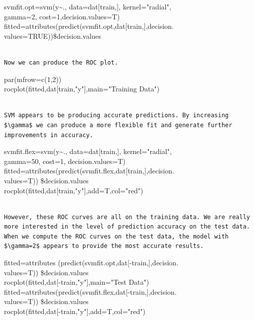 \documentclass[10pt]{article}
\begin{document}
\begin{displayquote}
svmfit.opt=svm(y\~{}., data=dat[train,], kernel="radial",\\
gamma=2, cost=1,decision.values=T)\\[0pt]
fitted=attributes(predict(svmfit.opt,dat[train,],decision.\\
values=TRUE))\$decision.values
\end{displayquote}

\begin{verbatim}

Now we can produce the ROC plot.
\end{verbatim}

\begin{displayquote}
par(mfrow=c(1,2))\\[0pt]
rocplot(fitted,dat[train,"y"],main="Training Data")
\end{displayquote}

\begin{verbatim}

SVM appears to be producing accurate predictions. By increasing $\gamma$ we can produce a more flexible fit and generate further improvements in accuracy.
\end{verbatim}

\begin{displayquote}
svmfit.flex=svm(y\~{}., data=dat[train,], kernel="radial",\\
gamma=50, cost=1, decision.values=T)\\[0pt]
fitted=attributes(predict(svmfit.flex,dat[train,],decision.\\
values=T)) \$decision.values\\[0pt]
rocplot(fitted,dat[train,"y"],add=T,col="red")
\end{displayquote}

\begin{verbatim}

However, these ROC curves are all on the training data. We are really more interested in the level of prediction accuracy on the test data. When we compute the ROC curves on the test data, the model with $\gamma=2$ appears to provide the most accurate results.
\end{verbatim}

\begin{displayquote}
fitted=attributes (predict(svmfit.opt,dat[-train,],decision.\\
values=T)) \$decision.values\\[0pt]
rocplot(fitted,dat[-train,"y"],main="Test Data")\\[0pt]
fitted=attributes(predict(svmfit.flex,dat[-train,],decision.\\
values=T)) \$decision.values\\[0pt]
rocplot(fitted,dat[-train,"y"],add=T,col="red")
\end{displayquote}
\end{document}
